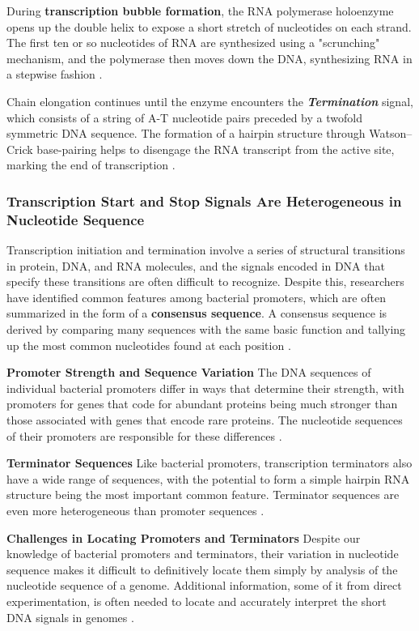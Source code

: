 During \textbf{transcription bubble formation}, the RNA polymerase holoenzyme opens up the double helix to expose a short stretch of nucleotides on each strand. The first ten or so nucleotides of RNA are synthesized using a "scrunching" mechanism, and the polymerase then moves down the DNA, synthesizing RNA in a stepwise fashion \cite*{L1-Chapter6}.

Chain elongation continues until the enzyme encounters the \textbf{\textit{Termination}} signal, which consists of a string of A-T nucleotide pairs preceded by a twofold symmetric DNA sequence. The formation of a hairpin structure through Watson–Crick base-pairing helps to disengage the RNA transcript from the active site, marking the end of transcription \cite*{L1-Chapter6}.

\subsubsection*{Transcription Start and Stop Signals Are Heterogeneous in Nucleotide Sequence}
Transcription initiation and termination involve a series of structural transitions in protein, DNA, and RNA molecules, and the signals encoded in DNA that specify these transitions are often difficult to recognize. Despite this, researchers have identified common features among bacterial promoters, which are often summarized in the form of a \textbf{consensus sequence}. A consensus sequence is derived by comparing many sequences with the same basic function and tallying up the most common nucleotides found at each position \cite*{L1-Chapter6}.

\textbf{Promoter Strength and Sequence Variation}
The DNA sequences of individual bacterial promoters differ in ways that determine their strength, with promoters for genes that code for abundant proteins being much stronger than those associated with genes that encode rare proteins. The nucleotide sequences of their promoters are responsible for these differences \cite*{L1-Chapter6}.

\textbf{Terminator Sequences}
Like bacterial promoters, transcription terminators also have a wide range of sequences, with the potential to form a simple hairpin RNA structure being the most important common feature. Terminator sequences are even more heterogeneous than promoter sequences \cite*{L1-Chapter6}.

\textbf{Challenges in Locating Promoters and Terminators}
Despite our knowledge of bacterial promoters and terminators, their variation in nucleotide sequence makes it difficult to definitively locate them simply by analysis of the nucleotide sequence of a genome. Additional information, some of it from direct experimentation, is often needed to locate and accurately interpret the short DNA signals in genomes \cite*{L1-Chapter6}.


